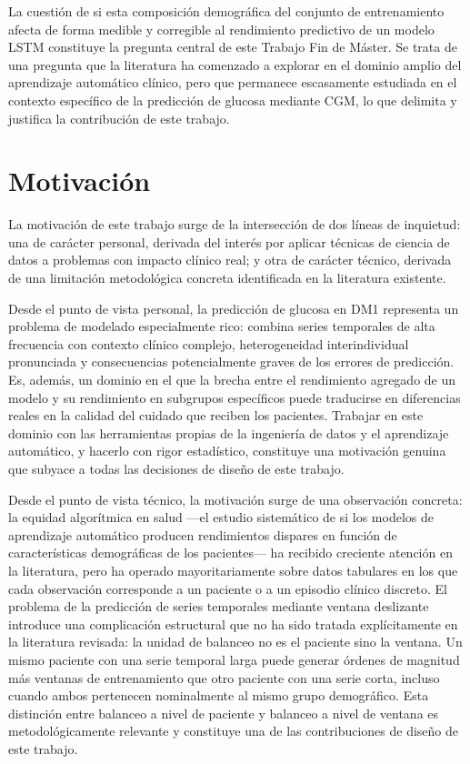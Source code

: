 La cuestión de si esta composición demográfica del conjunto de entrenamiento afecta de forma medible y corregible al rendimiento predictivo de un modelo LSTM constituye la pregunta central de este Trabajo Fin de Máster. Se trata de una pregunta que la literatura ha comenzado a explorar en el dominio amplio del aprendizaje automático clínico, pero que permanece escasamente estudiada en el contexto específico de la predicción de glucosa mediante CGM, lo que delimita y justifica la contribución de este trabajo.

\section{Motivación}
\label{section:motivacion}

La motivación de este trabajo surge de la intersección de dos líneas de inquietud:
una de carácter personal, derivada del interés por aplicar técnicas de ciencia de
datos a problemas con impacto clínico real; y otra de carácter técnico, derivada de
una limitación metodológica concreta identificada en la literatura existente.

Desde el punto de vista personal, la predicción de glucosa en DM1 representa un
problema de modelado especialmente rico: combina series temporales de alta frecuencia
con contexto clínico complejo, heterogeneidad interindividual pronunciada y
consecuencias potencialmente graves de los errores de predicción. Es, además, un
dominio en el que la brecha entre el rendimiento agregado de un modelo y su
rendimiento en subgrupos específicos puede traducirse en diferencias reales en la
calidad del cuidado que reciben los pacientes. Trabajar en este dominio con las
herramientas propias de la ingeniería de datos y el aprendizaje automático, y
hacerlo con rigor estadístico, constituye una motivación genuina que subyace a
todas las decisiones de diseño de este trabajo.

Desde el punto de vista técnico, la motivación surge de una observación concreta:
la equidad algorítmica en salud ---el estudio sistemático de si los modelos de
aprendizaje automático producen rendimientos dispares en función de características
demográficas de los pacientes--- ha recibido creciente atención en la literatura,
pero ha operado mayoritariamente sobre datos tabulares en los que cada observación
corresponde a un paciente o a un episodio clínico discreto. El problema de la
predicción de series temporales mediante ventana deslizante introduce una complicación
estructural que no ha sido tratada explícitamente en la literatura revisada: la unidad
de balanceo no es el paciente sino la ventana. Un mismo paciente con una serie temporal
larga puede generar órdenes de magnitud más ventanas de entrenamiento que otro paciente
con una serie corta, incluso cuando ambos pertenecen nominalmente al mismo grupo
demográfico. Esta distinción entre balanceo a nivel de paciente y balanceo a nivel de
ventana es metodológicamente relevante y constituye una de las contribuciones de diseño
de este trabajo.

